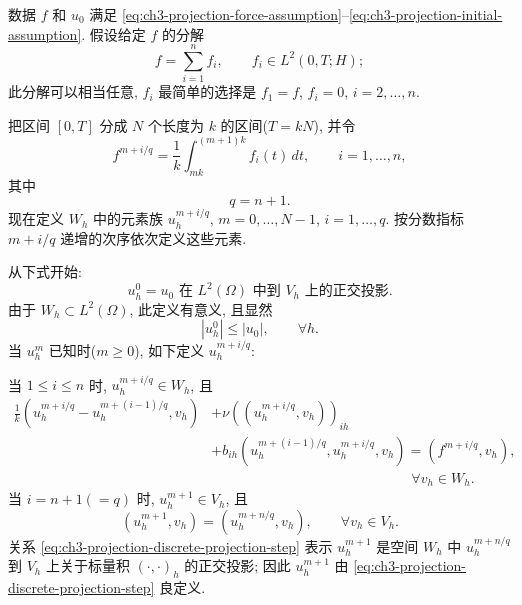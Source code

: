 数据 $f$ 和 $u_0$ 满足 \eqref{eq:ch3-projection-force-assumption}--\eqref{eq:ch3-projection-initial-assumption}. 假设给定 $f$ 的分解
\begin{equation}
f=\sum_{i=1}^n f_i,\qquad f_i\in L^2(0,T;H);
\label{eq:ch3-projection-force-decomposition}
\end{equation}
此分解可以相当任意, $f_i$ 最简单的选择是 $f_1=f$, $f_i=0$, $i=2,\ldots,n$.

把区间 $[0,T]$ 分成 $N$ 个长度为 $k$ 的区间($T=kN$), 并令
\begin{equation}
f^{m+i/q}=\frac1k\int_{mk}^{(m+1)k}f_i(t)\,dt,
\qquad i=1,\ldots,n,
\label{eq:ch3-projection-directional-force-average}
\end{equation}
其中
\begin{equation}
q=n+1.
\label{eq:ch3-projection-q}
\end{equation}
现在定义 $W_h$ 中的元素族 $u_h^{m+i/q}$, $m=0,\ldots,N-1$, $i=1,\ldots,q$. 按分数指标 $m+i/q$ 递增的次序依次定义这些元素.

\hypertarget{chapter-03-page-293}{}
从下式开始:
\begin{equation}
u_h^0=\text{$u_0$ 在 $L^2(\Omega)$ 中到 $V_h$ 上的正交投影}.
\label{eq:ch3-projection-discrete-initial}
\end{equation}
由于 $W_h\subset L^2(\Omega)$, 此定义有意义, 且显然
\begin{equation}
|u_h^0|\leq|u_0|,\qquad\forall h.
\label{eq:ch3-projection-discrete-initial-bound}
\end{equation}
当 $u_h^m$ 已知时($m\geq0$), 如下定义 $u_h^{m+i/q}$:

当 $1\leq i\leq n$ 时, $u_h^{m+i/q}\in W_h$, 且
\begin{equation}
\begin{aligned}
\frac1k(u_h^{m+i/q}-u_h^{m+(i-1)/q},v_h)
&+\nu((u_h^{m+i/q},v_h))_{ih}\\
&+b_{ih}(u_h^{m+(i-1)/q},u_h^{m+i/q},v_h)
=(f^{m+i/q},v_h),\\
&\hspace{6cm}\forall v_h\in W_h.
\end{aligned}
\label{eq:ch3-projection-discrete-directional-step}
\end{equation}
当 $i=n+1(=q)$ 时, $u_h^{m+1}\in V_h$, 且
\begin{equation}
(u_h^{m+1},v_h)=(u_h^{m+n/q},v_h),
\qquad\forall v_h\in V_h.
\label{eq:ch3-projection-discrete-projection-step}
\end{equation}
关系 \eqref{eq:ch3-projection-discrete-projection-step} 表示 $u_h^{m+1}$ 是空间 $W_h$ 中 $u_h^{m+n/q}$ 到 $V_h$ 上关于标量积 $(\cdot,\cdot)_h$ 的正交投影; 因此 $u_h^{m+1}$ 由 \eqref{eq:ch3-projection-discrete-projection-step} 良定义.

